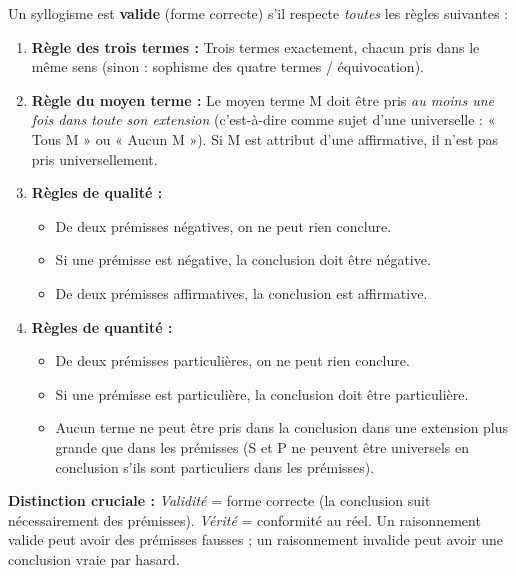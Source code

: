 \documentclass[11pt]{article}
\begin{document}
\begin{propriete}
Un syllogisme est \textbf{valide} (forme correcte) s'il respecte \emph{toutes} les règles suivantes :
\begin{enumerate}
\item \textbf{Règle des trois termes :} Trois termes exactement, chacun pris dans le même sens (sinon : sophisme des quatre termes / équivocation).
\item \textbf{Règle du moyen terme :} Le moyen terme M doit être pris \emph{au moins une fois dans toute son extension} (c'est-à-dire comme sujet d'une universelle : « Tous M » ou « Aucun M »). Si M est attribut d'une affirmative, il n'est pas pris universellement.
\item \textbf{Règles de qualité :}
\begin{itemize}
\item De deux prémisses négatives, on ne peut rien conclure.
\item Si une prémisse est négative, la conclusion doit être négative.
\item De deux prémisses affirmatives, la conclusion est affirmative.
\end{itemize}
\item \textbf{Règles de quantité :}
\begin{itemize}
\item De deux prémisses particulières, on ne peut rien conclure.
\item Si une prémisse est particulière, la conclusion doit être particulière.
\item Aucun terme ne peut être pris dans la conclusion dans une extension plus grande que dans les prémisses (S et P ne peuvent être universels en conclusion s'ils sont particuliers dans les prémisses).
\end{itemize}
\end{enumerate}
\textbf{Distinction cruciale :} \emph{Validité} = forme correcte (la conclusion suit nécessairement des prémisses). \emph{Vérité} = conformité au réel. Un raisonnement valide peut avoir des prémisses fausses ; un raisonnement invalide peut avoir une conclusion vraie par hasard.
\end{propriete}
\end{document}
